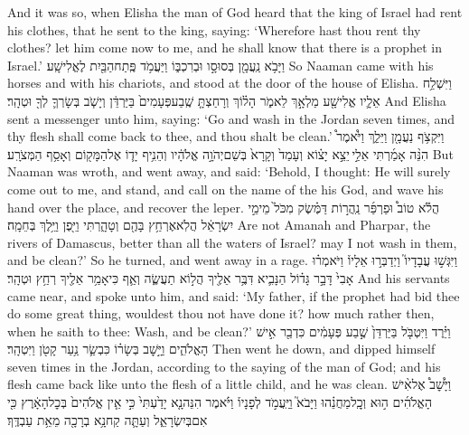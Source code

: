 {And it was so, when Elisha the man of God heard that the king of Israel had rent his clothes, that he sent to the king, saying: ‘Wherefore hast thou rent thy clothes? let him come now to me, and he shall know that there is a prophet in Israel.’}
{וַיָּבֹ֥א נַֽעֲמָ֖ן בְּסוּסָ֣ו וּבְרִכְבּ֑וֹ וַיַּעֲמֹ֥ד פֶּֽתַח\maqqaf הַבַּ֖יִת לֶאֱלִישָֽׁע׃}
{So Naaman came with his horses and with his chariots, and stood at the door of the house of Elisha.}
{וַיִּשְׁלַ֥ח אֵלָ֛יו אֱלִישָׁ֖ע מַלְאָ֣ךְ לֵאמֹ֑ר הָל֗וֹךְ וְרָחַצְתָּ֤ שֶֽׁבַע\maqqaf פְּעָמִים֙ בַּיַּרְדֵּ֔ן וְיָשֹׁ֧ב בְּשָׂרְךָ֛ לְךָ֖ וּטְהָֽר׃}
{And Elisha sent a messenger unto him, saying: ‘Go and wash in the Jordan seven times, and thy flesh shall come back to thee, and thou shalt be clean.’}
{וַיִּקְצֹ֥ף נַעֲמָ֖ן וַיֵּלַ֑ךְ וַיֹּ֩אמֶר֩ הִנֵּ֨ה אָמַ֜רְתִּי אֵלַ֣י \legarmeh  יֵצֵ֣א יָצ֗וֹא וְעָמַד֙ וְקָרָא֙ בְּשֵׁם\maqqaf יְהֹוָ֣ה אֱלֹהָ֔יו וְהֵנִ֥יף יָד֛וֹ אֶל\maqqaf הַמָּק֖וֹם וְאָסַ֥ף הַמְּצֹרָֽע׃}
{But Naaman was wroth, and went away, and said: ‘Behold, I thought: He will surely come out to me, and stand, and call on the name of the \lord\space his God, and wave his hand over the place, and recover the leper.}
{הֲלֹ֡א טוֹב֩  וּפַרְפַּ֜ר נַֽהֲר֣וֹת דַּמֶּ֗שֶׂק מִכֹּל֙ מֵימֵ֣י יִשְׂרָאֵ֔ל הֲלֹֽא\maqqaf אֶרְחַ֥ץ בָּהֶ֖ם וְטָהָ֑רְתִּי וַיִּ֖פֶן וַיֵּ֥לֶךְ בְּחֵמָֽה׃}
{Are not Amanah and Pharpar, the rivers of Damascus, better than all the waters of Israel? may I not wash in them, and be clean?’ So he turned, and went away in a rage.}
{וַיִּגְּשׁ֣וּ עֲבָדָיו֮ וַיְדַבְּר֣וּ אֵלָיו֒ וַיֹּאמְר֗וּ אָבִי֙ דָּבָ֣ר גָּד֗וֹל הַנָּבִ֛יא דִּבֶּ֥ר אֵלֶ֖יךָ הֲל֣וֹא תַעֲשֶׂ֑ה וְאַ֛ף כִּי\maqqaf אָמַ֥ר אֵלֶ֖יךָ רְחַ֥ץ וּטְהָֽר׃}
{And his servants came near, and spoke unto him, and said: ‘My father, if the prophet had bid thee do some great thing, wouldest thou not have done it? how much rather then, when he saith to thee: Wash, and be clean?’}
{וַיֵּ֗רֶד וַיִּטְבֹּ֤ל בַּיַּרְדֵּן֙ שֶׁ֣בַע פְּעָמִ֔ים כִּדְבַ֖ר אִ֣ישׁ הָאֱלֹהִ֑ים וַיָּ֣שׇׁב בְּשָׂר֗וֹ כִּבְשַׂ֛ר נַ֥עַר קָטֹ֖ן וַיִּטְהָֽר׃}
{Then went he down, and dipped himself seven times in the Jordan, according to the saying of the man of God; and his flesh came back like unto the flesh of a little child, and he was clean.}
{וַיָּ֩שׇׁב֩ אֶל\maqqaf אִ֨ישׁ הָאֱלֹהִ֜ים ה֣וּא וְכׇֽל\maqqaf מַחֲנֵ֗הוּ וַיָּבֹא֮ וַיַּֽעֲמֹ֣ד לְפָנָיו֒ וַיֹּ֗אמֶר הִנֵּה\maqqaf נָ֤א יָדַ֙עְתִּי֙ כִּ֣י אֵ֤ין אֱלֹהִים֙ בְּכׇל\maqqaf הָאָ֔רֶץ כִּ֖י אִם\maqqaf בְּיִשְׂרָאֵ֑ל וְעַתָּ֛ה קַח\maqqaf נָ֥א בְרָכָ֖ה מֵאֵ֥ת עַבְדֶּֽךָ׃}
